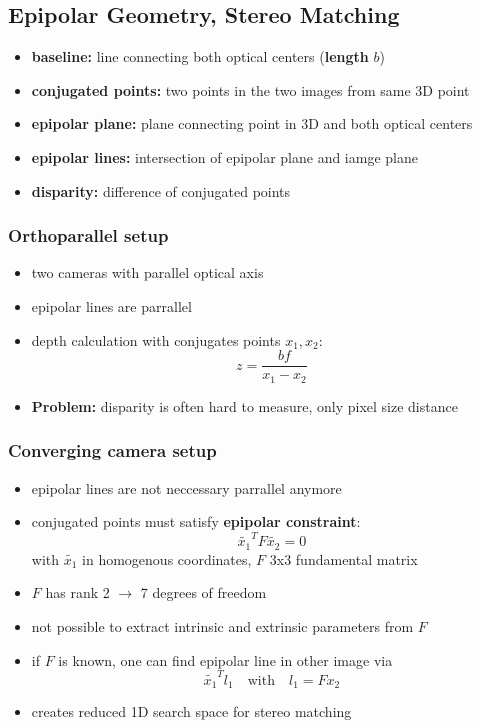 \documentclass[11pt]{article}
\begin{document}
\subsection{Epipolar Geometry, Stereo Matching}
\label{sec-6-2}
\begin{itemize}
\item \textbf{baseline:} line connecting both optical centers (\textbf{length} $b$)
\item \textbf{conjugated points:} two points in the two images from same 3D point
\item \textbf{epipolar plane:} plane connecting point in 3D and both optical centers
\item \textbf{epipolar lines:} intersection of epipolar plane and iamge plane
\item \textbf{disparity:} difference of conjugated points
\end{itemize}

\subsubsection{Orthoparallel setup}
\label{sec-6-2-1}
\begin{itemize}
\item two cameras with parallel optical axis
\item epipolar lines are parrallel
\item depth calculation with conjugates points $x_1,x_2$:
      \[ z = \frac{bf}{x_1 - x_2} \]
\item \textbf{Problem:} disparity is often hard to measure, only pixel size distance
\end{itemize}
\subsubsection{Converging camera setup}
\label{sec-6-2-2}
\begin{itemize}
\item epipolar lines are not neccessary parrallel anymore
\item conjugated points must satisfy \textbf{epipolar constraint}:
\[ \tilde{x_1}^T F \tilde{x_2} = 0 \]
with $\tilde{x_1}$ in homogenous coordinates, $F$ 3x3 fundamental matrix
\item $F$ has rank 2 $\rightarrow$ 7 degrees of freedom
\item not possible to extract intrinsic and extrinsic parameters from $F$
\item if $F$ is known, one can find epipolar line in other image via
      \[ \tilde{x_1}^Tl_1 \quad \text{with}\quad l_1 = Fx_2 \]
\item creates reduced 1D search space for stereo matching
\end{itemize}
\end{document}
